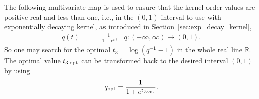 \documentclass{iitthesis}          %
\newcommand{\reals}{\mathbb{R}}
\newcommand\secref{Section~\ref}
\begin{document}
The following multivariate map is used to ensure that the kernel order values are positive real and less than one, i.e., in the $(0,1)$ interval to use with exponentially decaying kernel, as introduced in \secref{sec:exp_decay_kernel},
\begin{align*}
q(t) = & \quad \frac{1}{1 + e^{t}}, & q: (-\infty, \infty) \to (0, 1).
\end{align*}
So one may search for the optimal $t_3 = \log(q^{-1}-1)$ in the whole real line $\reals$.
The optimal value $t_{3, \textup{opt}}$ can be transformed back to the desired interval $(0,1)$ by using
\begin{align*}
q_{\textup{opt}} = \frac{1}{1 + e^{t_{3, \textup{opt}}}}.
\end{align*}
\end{document}
